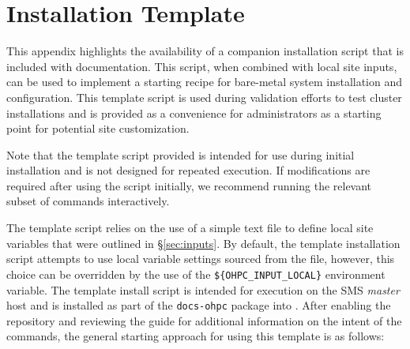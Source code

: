 \section{Installation Template}  \label{appendix:template_script}

This appendix highlights the availability of a companion installation script
that is included with \OHPC{} documentation. This script, when combined with
local site inputs, can be used to implement a starting recipe for
bare-metal system installation and configuration. This template script is used
during validation efforts to test cluster installations and is provided as a
convenience for administrators as a starting point for potential site
customization.

\begin{center}
\begin{tcolorbox}[]
\small Note that the template script provided is intended for use during
initial installation and is not designed for repeated execution.  If
modifications are required after using the script initially, we recommend
running the relevant subset of commands interactively.
\end{tcolorbox}
\end{center}

The template script relies on the use of a simple text file to define local
site variables that were outlined in \S\ref{sec:inputs}. By default, the
template installation script attempts to use local variable settings sourced from
the  file, however, this
choice can be overridden by the use of the \texttt{\$\{OHPC\_INPUT\_LOCAL\}}
environment variable. The template install script is intended for execution on
the SMS {\em master} host and is installed as part of the \texttt{docs-ohpc}
package into . After
enabling the \OHPC{} repository and reviewing the guide for additional
information on the intent of the commands, the general starting approach for
using this template is as follows:

